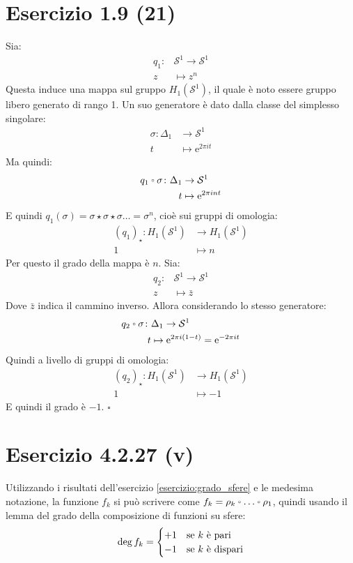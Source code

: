\documentclass[10pt]{scrartcl}
\newcommand{\Sph}[1][]{\mathcal{S}^#1}
\let\latexcirc=\circ
\newcommand{\ccirc}{\mathbin{\mathchoice
  {\xcirc\scriptstyle}
  {\xcirc\scriptstyle}
  {\xcirc\scriptscriptstyle}
  {\xcirc\scriptscriptstyle}
}}
\newcommand{\xcirc}[1]{\vcenter{\hbox{$#1\latexcirc$}}}
\let\circ\ccirc
\begin{document}
\section{Esercizio 1.9 (21)}
Sia:
\begin{align*}
  q_1 \colon & \Sph{1} \to \Sph{1} \\
  z & \mapsto z^n
\end{align*}
Questa induce una mappa sul gruppo $ H_1(\Sph{1}) $,
il quale è noto essere gruppo libero generato di rango 1.
Un suo generatore è dato dalla classe del simplesso
singolare:
\begin{align*}
  \sigma \colon \Delta_1 & \to \Sph{1} \\
  t & \mapsto \mathrm{e}^{2 \pi i t}
\end{align*}
Ma quindi:
\begin{align*}
  q_1 \circ \sigma \colon \Delta_1 & \to \Sph{1} \\
  t & \mapsto \mathrm{e}^{2 \pi i n t}
\end{align*}
E quindi $ q_1(\sigma) = \sigma \star \sigma \star \sigma \dots = \sigma^n $, cioè sui gruppi
di omologia:
\begin{align*}
  (q_1)_\star \colon H_1(\Sph{1}) & \to H_1(\Sph{1}) \\
  1 & \mapsto n
\end{align*}
Per questo il grado della mappa è $ n $.
Sia:
\begin{align*}
  q_2 \colon & \Sph{1} \to \Sph{1} \\
  z & \mapsto \bar{z}
\end{align*}
Dove $ \bar{z} $ indica il cammino inverso. Allora
considerando lo stesso generatore:
\begin{align*}
  q_2 \circ \sigma \colon & \Delta_1 \to \Sph{1} \\
  t & \mapsto \mathrm{e}^{2 \pi i (1 - t)} = \mathrm{e}^{-2 \pi i t}
\end{align*}
Quindi a livello di gruppi di omologia:
\begin{align*}
  (q_2)_\star \colon H_1(\Sph{1}) & \to H_1(\Sph{1}) \\
  1 & \mapsto -1
\end{align*}
E quindi il grado è $ -1 $.
\hfill $ \square $

\section{Esercizio 4.2.27 (v)}

Utilizzando i risultati dell'esercizio \ref{esercizio:grado_sfere}
e le medesima notazione, la funzione $ f_k $ si può scrivere come
$ f_k = \rho_k \circ \dots \circ \rho_1 $, quindi usando il lemma del grado della
composizione di funzioni su sfere:
\[
  \deg {f_k} =
  \begin{cases}
    + 1 & \text{se $ k $ è pari} \\
    - 1 & \text{se $ k $ è dispari}
  \end{cases}
\]
\end{document}
